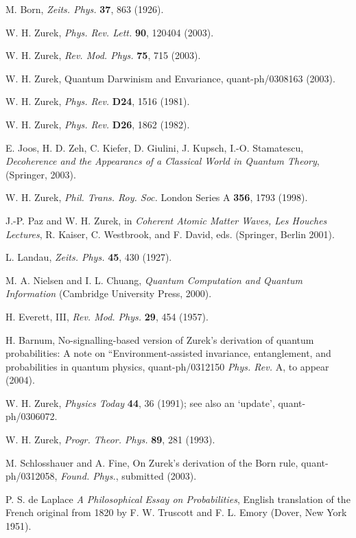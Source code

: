 \documentclass[aps,pra,epsfig,11pt,floatfix]{revtex4}
\begin{document}
\bigskip


\medskip

\noindent[1] M. Born, {\it Zeits. Phys.} {\bf 37}, 863 (1926).

\noindent[2] W. H. Zurek, {\it Phys. Rev. Lett.} {\bf 90}, 120404 (2003).

\noindent[3] W. H. Zurek, {\it Rev. Mod. Phys.} {\bf 75}, 715 (2003).

\noindent[4] W. H. Zurek, Quantum Darwinism and Envariance, 
quant-ph/0308163 (2003).

\noindent[5] W. H. Zurek, {\it Phys. Rev.} {\bf D24}, 1516 (1981).

\noindent[6] W. H. Zurek, {\it Phys. Rev.} {\bf D26}, 1862 (1982).

\noindent[7] E. Joos, H. D. Zeh, C. Kiefer, D. Giulini, J. Kupsch, 
I.-O. Stamatescu, {\it Decoherence and the Appearancs of 
a Classical World in Quantum Theory}, (Springer, 2003).

\noindent[8] W. H. Zurek, {\it Phil. Trans. Roy. Soc.} London Series A 
{\bf 356}, 1793 (1998).

\noindent[9] J.-P. Paz and W. H. Zurek, in {\it Coherent Atomic Matter Waves, 
Les Houches Lectures}, R. Kaiser, C. Westbrook, and F. David, eds.
(Springer, Berlin 2001).

\noindent[10] L. Landau, {\it Zeits. Phys.} {\bf 45}, 430 (1927). 

\noindent[11] M. A. Nielsen and I. L. Chuang, {\it Quantum Computation 
and Quantum Information} (Cambridge University Press, 2000).

\noindent[12] H. Everett, III, {\it Rev. Mod. Phys.} {\bf 29}, 454 (1957).

\noindent[13] H. Barnum, No-signalling-based version of Zurek's derivation 
of quantum probabilities: A note on ``Environment-assisted invariance,
entanglement, and probabilities in quantum physics, quant-ph/0312150
{\it Phys. Rev.} A, to appear (2004).

\noindent[14] W. H. Zurek, {\it Physics Today} {\bf 44}, 36 (1991); see also
an `update', quant-ph/0306072.

\noindent[15] W. H. Zurek, {\it Progr. Theor. Phys.} {\bf 89}, 281 (1993).

\noindent[16] M. Schlosshauer and A. Fine, On Zurek's derivation
 of the Born rule, quant-ph/0312058, {\it Found. Phys.}, submitted (2003).

\noindent[17] P. S. de Laplace {\it A Philosophical Essay on Probabilities},
English translation of the French original from 1820 
by F. W. Truscott and F. L. Emory (Dover, New York 1951).
\end{document}

